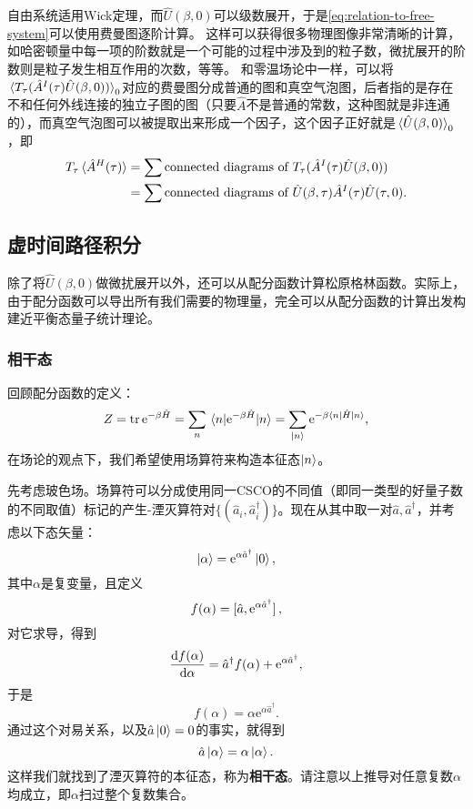 \documentclass[hyperref, UTF8, a4paper]{ctexart}
\newcommand*{\ee}{\mathrm{e}}
\begin{document}
自由系统适用Wick定理，而$\hat{U}(\beta, 0)$可以级数展开，于是\eqref{eq:relation-to-free-system}可以使用费曼图逐阶计算。
这样可以获得很多物理图像非常清晰的计算，如哈密顿量中每一项的阶数就是一个可能的过程中涉及到的粒子数，微扰展开的阶数则是粒子发生相互作用的次数，等等。
和零温场论中一样，可以将$\expval*{T_\tau (\hat{A}^I (\tau) \hat{U}(\beta, 0))}_0$对应的费曼图分成普通的图和真空气泡图，后者指的是存在不和任何外线连接的独立子图的图（只要$\hat{A}$不是普通的常数，这种图就是非连通的），而真空气泡图可以被提取出来形成一个因子，这个因子正好就是$\expval*{\hat{U}(\beta, 0)}_0$，即
\begin{equation}
    \begin{aligned}
        T_\tau \expval*{\hat{A}^H (\tau)} &= \sum \text{connected diagrams of $T_\tau (\hat{A}^I (\tau) \hat{U}(\beta, 0))$} \\
        &= \sum \text{connected diagrams of $\hat{U}(\beta, \tau) \hat{A}^I (\tau) \hat{U}(\tau, 0)$}.
    \end{aligned}
\end{equation}

\subsection{虚时间路径积分}\label{sec:imaginary-path-integral}

除了将$\hat{U}(\beta, 0)$做微扰展开以外，还可以从配分函数计算松原格林函数。实际上，由于配分函数可以导出所有我们需要的物理量，完全可以从配分函数的计算出发构建近平衡态量子统计理论。

\subsubsection{相干态}

回顾配分函数的定义：
\[
    Z = \trace \ee^{- \beta \hat{H}} = \sum_n \mel{n}{\ee^{ - \beta \hat{H}}}{n} = \sum_{\ket{n}} \ee^{ -\beta \mel{n}{\hat{H}}{n}},
\]
在场论的观点下，我们希望使用场算符来构造本征态$\ket{n}$。

先考虑玻色场。场算符可以分成使用同一CSCO的不同值（即同一类型的好量子数的不同取值）标记的产生-湮灭算符对$\{(\hat{a}_i, \hat{a}_i^\dagger)\}$。现在从其中取一对$\hat{a}, \hat{a}^\dagger$，并考虑以下态矢量：
\begin{equation}
    \ket{\alpha} = \ee^{\alpha \hat{a}^\dagger} \ket{0},
\end{equation}
其中$\alpha$是复变量，且定义
\[
    f(\alpha) = \comm*{\hat{a}}{\ee^{\alpha \hat{a}^\dagger}},
\]
对它求导，得到
\[
    \dv{f(\alpha)}{\alpha} = \hat{a}^\dagger f(\alpha) + \ee^{\alpha \hat{a}^\dagger},
\]
于是
\[
    f(\alpha) = \alpha \ee^{\alpha \hat{a}^\dagger}.
\]
通过这个对易关系，以及$\hat{a}\ket{0} = 0$的事实，就得到
\[
    \hat{a} \ket{\alpha} = \alpha \ket{\alpha}.
\]
这样我们就找到了湮灭算符的本征态，称为\textbf{相干态}。请注意以上推导对任意复数$\alpha$均成立，即$\alpha$扫过整个复数集合。
\end{document}
